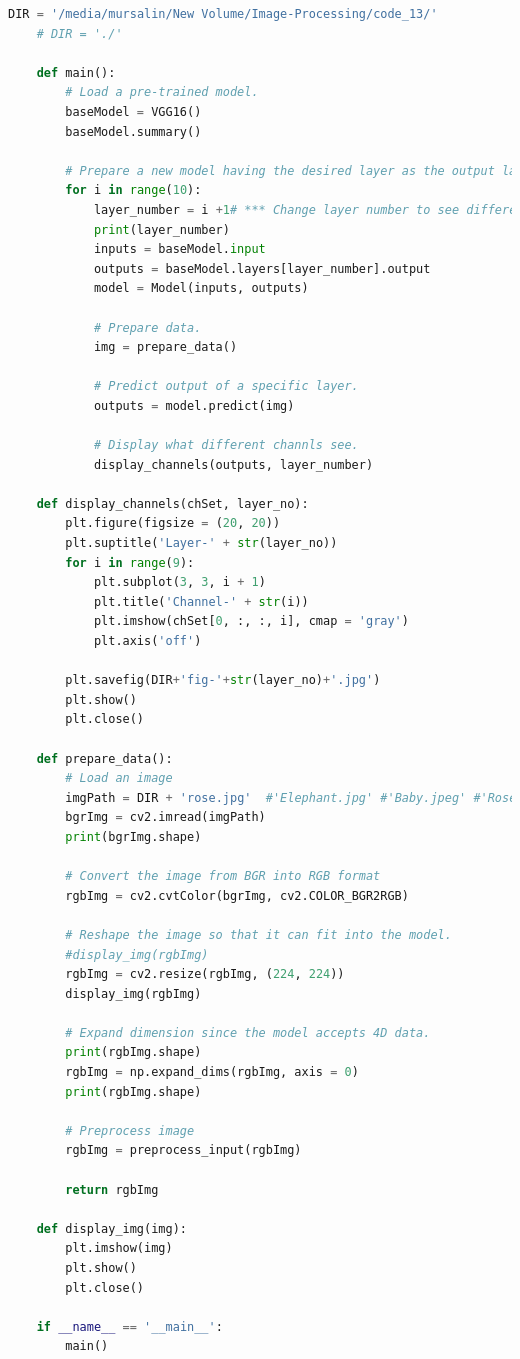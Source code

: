 \documentclass{article}
\begin{document}
{\begin{lstlisting}[language=Python, caption=Code for using pre trained model(VGG16)]
    DIR = '/media/mursalin/New Volume/Image-Processing/code_13/'
    # DIR = './'
    
    def main():
    	# Load a pre-trained model.
    	baseModel = VGG16()
    	baseModel.summary()
    		
    	# Prepare a new model having the desired layer as the output layer.
    	for i in range(10): 
    		layer_number = i +1# *** Change layer number to see different convolution layer's output.
    		print(layer_number)
    		inputs = baseModel.input
    		outputs = baseModel.layers[layer_number].output
    		model = Model(inputs, outputs)
    
    		# Prepare data.
    		img = prepare_data()
    
    		# Predict output of a specific layer.
    		outputs = model.predict(img)
    	
    		# Display what different channls see.
    		display_channels(outputs, layer_number)
    	
    def display_channels(chSet, layer_no):	
    	plt.figure(figsize = (20, 20))
    	plt.suptitle('Layer-' + str(layer_no))
    	for i in range(9):
    		plt.subplot(3, 3, i + 1)
    		plt.title('Channel-' + str(i))
    		plt.imshow(chSet[0, :, :, i], cmap = 'gray')
    		plt.axis('off')
    	
    	plt.savefig(DIR+'fig-'+str(layer_no)+'.jpg')
    	plt.show()
    	plt.close()
    	
    def prepare_data():
    	# Load an image
    	imgPath = DIR + 'rose.jpg'	#'Elephant.jpg' #'Baby.jpeg' #'Rose.jpeg' #'Boat.jpeg' #	
    	bgrImg = cv2.imread(imgPath)
    	print(bgrImg.shape)
    	
    	# Convert the image from BGR into RGB format
    	rgbImg = cv2.cvtColor(bgrImg, cv2.COLOR_BGR2RGB)
    	
    	# Reshape the image so that it can fit into the model.
    	#display_img(rgbImg)
    	rgbImg = cv2.resize(rgbImg, (224, 224))
    	display_img(rgbImg)
    	
    	# Expand dimension since the model accepts 4D data.
    	print(rgbImg.shape)
    	rgbImg = np.expand_dims(rgbImg, axis = 0)
    	print(rgbImg.shape)
    	
    	# Preprocess image
    	rgbImg = preprocess_input(rgbImg)
    	
    	return rgbImg
    	
    def display_img(img):
    	plt.imshow(img)
    	plt.show()
    	plt.close()
    
    if __name__ == '__main__':
    	main()


\end{lstlisting}}
\end{document}
